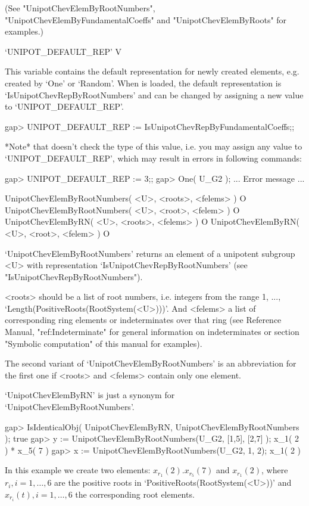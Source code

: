 (See  "UnipotChevElemByRootNumbers",  "UnipotChevElemByFundamentalCoeffs"
and "UnipotChevElemByRoots" for examples.)


\>`UNIPOT_DEFAULT_REP' V

This variable  contains  the  default representation  for  newly  created
elements, e.g. created by  `One' or `Random'. When  {\Unipot}  is loaded,
the  default representation is  `IsUnipotChevRepByRootNumbers' and can be
changed by assigning a new value to `UNIPOT_DEFAULT_REP'.

\beginexample
gap> UNIPOT_DEFAULT_REP := IsUnipotChevRepByFundamentalCoeffs;;
\endexample

*Note* that {\Unipot} doesn't check the type of this  value, i.e. you may
assign any value to `UNIPOT_DEFAULT_REP', which  may  result in errors in
following commands:

\begintt
gap> UNIPOT_DEFAULT_REP := 3;;
gap> One( U_G2 );
... Error message ...
\endtt

\>UnipotChevElemByRootNumbers( <U>, <roots>, <felems> ) O
\>UnipotChevElemByRootNumbers( <U>, <root>, <felem> ) O
\>UnipotChevElemByRN( <U>, <roots>, <felems> ) O
\>UnipotChevElemByRN( <U>, <root>, <felem> ) O

`UnipotChevElemByRootNumbers' returns  an element of a unipotent subgroup
<U>    with    representation    `Is\-UnipotChevRepByRootNumbers'    (see
"IsUnipotChevRepByRootNumbers").

<roots> should be a list of root numbers, i.e. integers from the range 1,
...,  `Length(PositiveRoots(Root\-System(<U>)))'. And <felems> a list  of
corresponding ring elements or indeterminates over that ring  (see {\GAP}
Reference   Manual,   "ref:Indeterminate"  for  general   information  on
indeterminates  or  section  "Symbolic computation"  of  this  manual for
examples).

The second  variant of  `UnipotChevElemByRootNumbers'  is an abbreviation
for the first one if <roots> and <felems> contain only one element.

`UnipotChevElemByRN' is just a synonym for `UnipotChevElemByRootNumbers'.

\beginexample
gap> IsIdenticalObj( UnipotChevElemByRN, UnipotChevElemByRootNumbers );
true
gap> y := UnipotChevElemByRootNumbers(U_G2, [1,5], [2,7] );
x_{1}( 2 ) * x_{5}( 7 )
gap> x := UnipotChevElemByRootNumbers(U_G2, 1, 2);
x_{1}( 2 )
\endexample

In this example we create two elements: $x_{r_1}( 2 ) . x_{r_5}( 7 )$ and
$x_{r_1}(  2  )$, where $r_i, i = 1,  \dots, 6$ are the positive roots in
`PositiveRoots(RootSystem(<U>))' and $x_{r_i}(t),  i  = 1, \dots, 6$  the
corresponding root elements.


